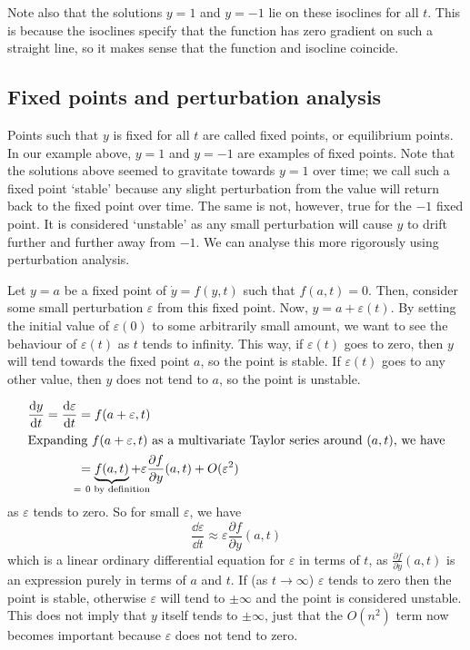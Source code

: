Note also that the solutions \(y = 1\) and \(y = -1\) lie on these isoclines for all \(t\).
This is because the isoclines specify that the function has zero gradient on such a straight line, so it makes sense that the function and isocline coincide.

\subsection{Fixed points and perturbation analysis}
Points such that \(y\) is fixed for all \(t\) are called fixed points, or equilibrium points.
In our example above, \(y=1\) and \(y=-1\) are examples of fixed points.
Note that the solutions above seemed to gravitate towards \(y=1\) over time; we call such a fixed point `stable' because any slight perturbation from the value will return back to the fixed point over time.
The same is not, however, true for the \(-1\) fixed point.
It is considered `unstable' as any small perturbation will cause \(y\) to drift further and further away from \(-1\).
We can analyse this more rigorously using perturbation analysis.

Let \(y = a\) be a fixed point of \(\dot y = f(y, t)\) such that \(f(a, t) = 0\).
Then, consider some small perturbation \(\varepsilon\) from this fixed point.
Now, \(y = a + \varepsilon(t)\).
By setting the initial value of \(\varepsilon(0)\) to some arbitrarily small amount, we want to see the behaviour of \(\varepsilon(t)\) as \(t\) tends to infinity.
This way, if \(\varepsilon(t)\) goes to zero, then \(y\) will tend towards the fixed point \(a\), so the point is stable.
If \(\varepsilon(t)\) goes to any other value, then \(y\) does not tend to \(a\), so the point is unstable.

\begin{align*}
	\frac{\dd{y}}{\dd{t}} = \frac{\dd \varepsilon}{\dd{t}} & = f(a + \varepsilon, t)                                                                                                            \\
	\intertext{Expanding \(f(a + \varepsilon, t)\) as a multivariate Taylor series around \((a, t)\), we have}
	                                                       & = \underbrace{f(a, t)}_{\mathclap{=\ 0\text{ by definition}}} + \varepsilon \frac{\partial f}{\partial y}(a, t) + O(\varepsilon^2)
\end{align*}
as \(\varepsilon\) tends to zero.
So for small \(\varepsilon\), we have
\[
	\frac{\dd \varepsilon}{\dd{t}} \approx \varepsilon \frac{\partial f}{\partial y}(a, t)
\]
which is a linear ordinary differential equation for \(\varepsilon\) in terms of \(t\), as \(\frac{\partial f}{\partial y}(a, t)\) is an expression purely in terms of \(a\) and \(t\).
If (as \(t \to \infty\)) \(\varepsilon\) tends to zero then the point is stable, otherwise \(\varepsilon\) will tend to \(\pm \infty\) and the point is considered unstable.
This does not imply that \(y\) itself tends to \(\pm \infty\), just that the \(O(n^2)\) term now becomes important because \(\varepsilon\) does not tend to zero.

